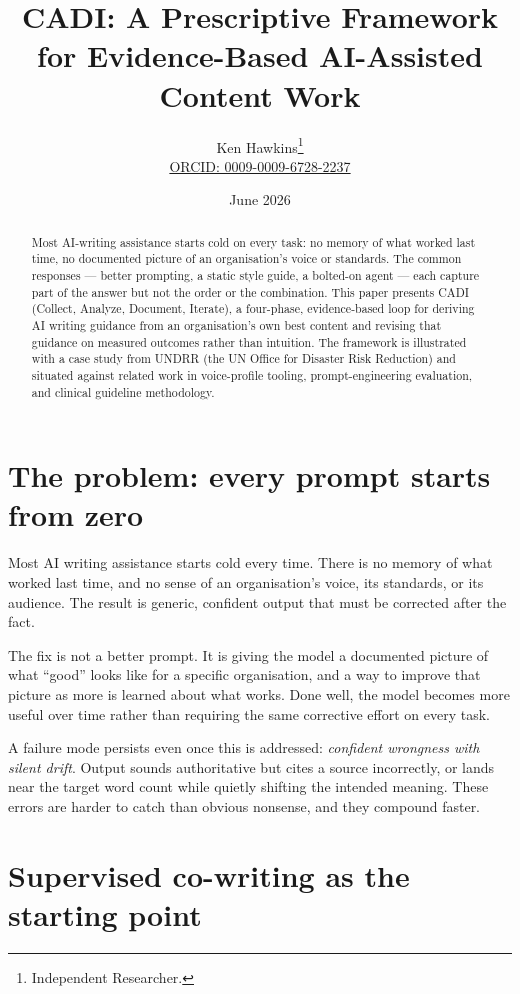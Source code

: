 \documentclass[11pt]{article}
\title{CADI: A Prescriptive Framework for Evidence-Based AI-Assisted Content Work}
\author{%
  Ken Hawkins\thanks{Independent Researcher.} \\
  \href{https://orcid.org/0009-0009-6728-2237}{ORCID: 0009-0009-6728-2237}
}
\date{June 2026}
\begin{document}
\maketitle

\begin{abstract}
Most AI-writing assistance starts cold on every task: no memory of what
worked last time, no documented picture of an organisation's voice or
standards. The common responses --- better prompting, a static style
guide, a bolted-on agent --- each capture part of the answer but not
the order or the combination. This paper presents CADI (Collect,
Analyze, Document, Iterate), a four-phase, evidence-based loop for
deriving AI writing guidance from an organisation's own best content
and revising that guidance on measured outcomes rather than intuition.
The framework is illustrated with a case study from UNDRR (the UN
Office for Disaster Risk Reduction) and situated against related work
in voice-profile tooling, prompt-engineering evaluation, and clinical
guideline methodology.
\end{abstract}

\section{The problem: every prompt starts from zero}

Most AI writing assistance starts cold every time. There is no memory
of what worked last time, and no sense of an organisation's voice, its
standards, or its audience. The result is generic, confident output
that must be corrected after the fact.

The fix is not a better prompt. It is giving the model a documented
picture of what ``good'' looks like for a specific organisation, and a
way to improve that picture as more is learned about what works. Done
well, the model becomes more useful over time rather than requiring
the same corrective effort on every task.

A failure mode persists even once this is addressed: \emph{confident
wrongness with silent drift}. Output sounds authoritative but cites a
source incorrectly, or lands near the target word count while quietly
shifting the intended meaning. These errors are harder to catch than
obvious nonsense, and they compound faster.

\section{Supervised co-writing as the starting point}
\end{document}
